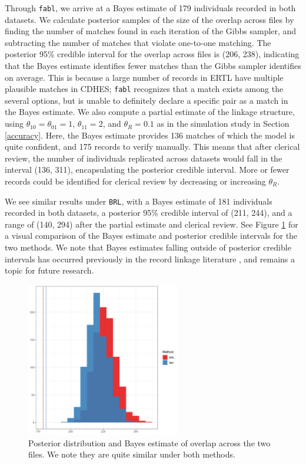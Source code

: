 \documentclass[ba]{imsart}
\begin{document}
	Through \texttt{fabl}, we arrive at a Bayes estimate of 179 individuals recorded in both datasets. We calculate posterior samples of the size of the overlap across files by finding the number of matches found in each iteration of the Gibbs sampler, and subtracting the number of matches that violate one-to-one matching. The posterior 95\% credible interval for the overlap across files is (206, 238), indicating that the Bayes estimate identifies fewer matches than the Gibbs sampler identifies on average. This is because a large number of records in ERTL have multiple plausible matches in CDHES; \texttt{fabl} recognizes that a match exists among the several options, but is unable to definitely declare a specific pair as a match in the Bayes estimate. We also compute a partial estimate of the linkage structure, using $\theta_{10} = \theta_{01} = 1$, $\theta_{11} = 2$, and $\theta_R = 0.1$ as in the simulation study in Section \ref{accuracy}. Here, the Bayes estimate provides 136 matches of which the model is quite confident, and 175 records to verify manually. This means that after clerical review, the number of individuals replicated across datasets would fall in the interval (136, 311), encapsulating the posterior credible interval. More or fewer records could be identified for clerical review by decreasing or increasing $\theta_R$. 
	
	We see similar results under \texttt{BRL}, with a Bayes estimate of 181 individuals recorded in both datasets, a posterior 95\% credible interval of (211, 244), and a range of (140, 294) after the partial estimate and clerical review. See Figure \ref{fig:overlap-plot} for a visual comparison of the Bayes estimate and posterior credible intervals for the two methods. We note that Bayes estimates falling outside of posterior credible intervals has occurred previously in the record linkage literature \citep{sadinle_bayesian_2017, steorts_bayesian_2016}, and remains a topic for future research.
	
	\begin{figure}[t]
		\begin{center}
			\includegraphics[width=0.6\textwidth]{../notes/figures/el_salvador/overlap_distribution_smallP_bayes}
			\caption{Posterior distribution and Bayes estimate of overlap across the two files. We note they are quite similar under both methods.}
			\label{fig:overlap-plot}
		\end{center}
	\end{figure}
	
\end{document}
